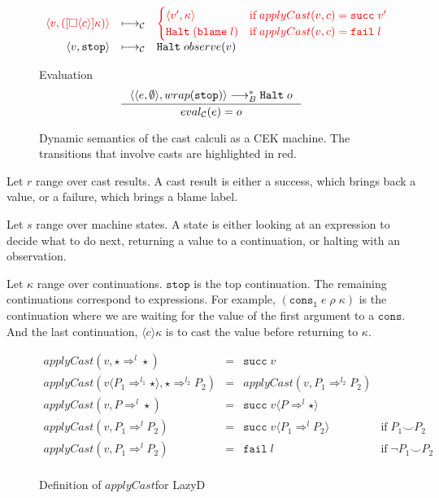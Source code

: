 \documentclass[acmsmall,review,anonymous]{acmart}\settopmatter{printfolios=true,printccs=false,printacmref=false}
\newcommand{\funrule}[3]{#1 &=& #2 & #3\\}
\newcommand{\lazyD}{Lazy\;D}
\newcommand{\sOOinspect}[3]{\langle\langle#1,#2\rangle,#3\rangle}
\newcommand{\sOOreturn}[2]{\langle#1,#2\rangle}
\newcommand{\sOOhalt}[1]{\mathtt{Halt} \; #1}
\newcommand{\cOOcast}[3]{#1 \Rightarrow^{#2} #3}
\newcommand{\oOOblame}[1]{\mathtt{blame} \; #1}
\newcommand{\vOOcast}[2]{#1\langle#2\rangle}
\newcommand{\rOOsucc}[1]{\mathtt{succ}\;#1}
\newcommand{\rOOfail}[1]{\mathtt{fail}\;#1}
\newcommand{\kOOmt}[0]{\mathtt{stop}}
\newcommand{\kOOcast}[2]{
	[\square \langle #1 \rangle]#2}
\newcommand{\hckOOmt}[0]{\mathtt{stop}}
\newcommand{\sidecond}[1]{\text{if}\;#1}
\newcommand{\judgeCeval}[2]{eval_{\mathcal{C}}(#1) = #2}
\newcommand{\redrule}[3]{#1 & \longmapsto_\mathcal{C} & #2 & #3\\}
\newcommand{\highlight}[1]{{\color{red} #1}}
\begin{document}
\begin{figure}
\[\begin{array}{rclr}
	\redrule{
		\highlight{\sOOreturn{v}{(
				\kOOcast{c}{\kappa}
			)}}
	}{
\highlight{          
\begin{cases}
	\sOOreturn{v'}{\kappa} & \sidecond{applyCast(v,c) = \rOOsucc{v'}}
	\\
	\sOOhalt{(\oOOblame{l})} & \sidecond{applyCast(v,c) = \rOOfail{l}}
\end{cases}}
	}{}
\redrule{
\sOOreturn{v}{\kOOmt}}{
\sOOhalt{observe(v)}}{}
	\end{array}
	\]	
	
	Evaluation \fbox{$\judgeCeval{e}{o}$}
	\[
	\inference{
		\sOOinspect{e}{\emptyset}{wrap(\hckOOmt)} \longrightarrow_{B}^{*} 
		\sOOhalt{o}
	}{
		\judgeCeval{e}{o}
	}
	\]
	
	\caption{Dynamic semantics of the cast calculi as a CEK
          machine. The transitions that involve casts are highlighted
          in red.}
	\label{fig:machine-cekc}
\end{figure}

Let $r$ range over cast results. A cast result is either a success, which 
brings back a value, or a failure, which brings a blame label.

Let $s$ range over machine states. A state is either looking at an 
expression to decide what to do next, returning a value to a continuation, or 
halting with an observation.

Let $\kappa$ range over continuations. $\mathtt{stop}$ is the top 
continuation. The remaining continuations correspond to expressions. For 
example, $(\mathtt{cons_1} \; e \; \rho \; \kappa)$ is the continuation where 
we are waiting for the value of the first argument to a $\mathtt{cons}$. And 
the last continuation, $\langle c \rangle \kappa$ is to cast the value before 
returning to $\kappa$.

\begin{figure}
	
	\[
	\begin{array}{rclr}
	\funrule{
		applyCast(v,\cOOcast{\star}{l}{\star})
	}{
		\rOOsucc{v}
	}{}
	\funrule{
		applyCast(\vOOcast{v}{\cOOcast{P_1}{l_1}{\star}},\cOOcast{\star}{l_2}{P_2})
	}{
		applyCast(v,\cOOcast{P_1}{l_2}{P_2})
	}{}
	\funrule{
		applyCast(v,\cOOcast{P}{l}{\star})
	}{
		\rOOsucc{\vOOcast{v}{\cOOcast{P}{l}{\star}}}
	}{}
	\funrule{
		applyCast(v,\cOOcast{P_1}{l}{P_2})
	}{
		\rOOsucc{\vOOcast{v}{\cOOcast{P_1}{l}{P_2}}}
	}{\sidecond{P_1 \smile P_2}}
	\funrule{
		applyCast(v,\cOOcast{P_1}{l}{P_2})
	}{
		\rOOfail{l}
	}{\sidecond{\neg P_1 \smile P_2}}
	
	\end{array}
	\]
	\caption{Definition of $applyCast$for \lazyD}
	\label{fig:applyCast-D-C}
\end{figure}
\end{document}
